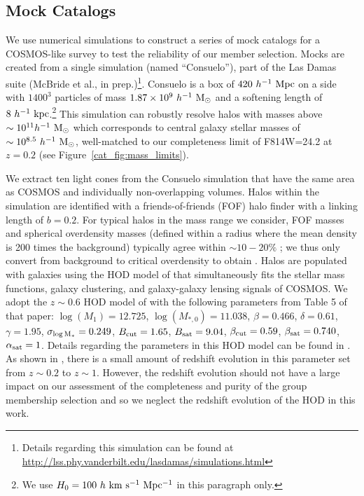 \subsection{Mock Catalogs}
\label{cat_s:mocks}

We use numerical simulations to construct a series of mock catalogs for a
COSMOS-like survey to test the reliability of our member
selection. Mocks are created from a single simulation (named 
``Consuelo''), part of the Las Damas suite (McBride et al., in prep.)\footnote{Details regarding this simulation can be found at {\url{http://lss.phy.vanderbilt.edu/lasdamas/simulations.html}}}. Consuelo
is a box of $420~h^{-1}~{\rm Mpc}$ on a side with 
$1400^3$ particles of mass $1.87 \times 10^9~h^{-1}~{\rm M}_{\odot}$
and a softening length of $8~h^{-1}~{\rm kpc}$.\footnote{We use
  $H_0=100~h~\rm{km~s^{-1}~Mpc^{-1}}$ in this paragraph only.} 
This simulation can robustly resolve halos with masses above
$\sim10^{11} h^{-1}~{\rm M_{\odot}}$ which corresponds to central
galaxy stellar masses of $\sim10^{8.5}~h^{-1}~{\rm M_{\odot}}$, well-matched
to our completeness limit of F814W=24.2 at $z=0.2$ (see
Figure~\ref{cat_fig:mass_limits}).

We extract ten light cones from the Consuelo simulation that have the
same area as COSMOS and individually non-overlapping volumes. Halos
within the simulation are identified with a friends-of-friends (FOF) halo
finder \citep{Davis1985} with a linking length of $b=0.2$. For typical
halos in the mass range we consider, FOF masses and
spherical overdensity masses (defined within a radius where the mean
density is 200 times the background) typically agree within $\sim10-20\%$
\citep{Tinker2008}; we thus only convert from background to critical
overdensity to obtain \mvir{}.
Halos are populated with galaxies using the HOD model of
\citet{Leauthaud2011a, Leauthaud2011b} 
that simultaneously fits the stellar mass functions, galaxy clustering,
and galaxy-galaxy lensing signals of COSMOS. We adopt the $z \sim 0.6$
HOD model of \citet{Leauthaud2011b} with the following parameters from
Table 5 of that paper:
$\log(M_{1})=12.725$, $\log(M_{*,0})=11.038$, $\beta=0.466$,
$\delta=0.61$, $\gamma=1.95$, $\sigma_{\log \rm  M_{*}}=0.249$,
$B_{\rm cut}=1.65$, $B_{\rm sat}=9.04$, $\beta_{\rm cut}=0.59$, 
$\beta_{\rm sat}=0.740$, $\alpha_{\rm sat}=1$. Details regarding the
parameters in this HOD model can be found in
\citet{Leauthaud2011a}. As shown in \citet{Leauthaud2011b}, there is a
small amount of redshift evolution in this parameter set from $z \sim
0.2$ to $z \sim 1$. However, the redshift evolution should not have a
large impact on our assessment of the completeness and purity of the
group membership selection and so we neglect the redshift evolution of
the HOD in this work.

